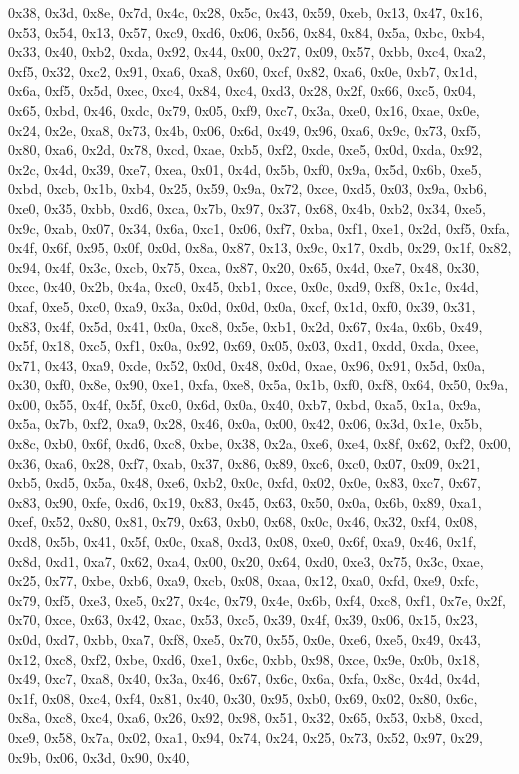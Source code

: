 \documentclass[
]{book}
\begin{document}
0x38, 0x3d, 0x8e, 0x7d, 0x4c, 0x28, 0x5c, 0x43, 0x59, 0xeb, 0x13, 0x47, 0x16, 0x53, 0x54, 0x13, 0x57, 0xc9, 0xd6, 0x06, 0x56, 0x84, 0x84, 0x5a, 0xbc, 0xb4, 0x33, 0x40, 0xb2, 0xda, 0x92, 0x44, 0x00, 0x27, 0x09, 0x57, 0xbb, 0xc4, 0xa2, 0xf5, 0x32, 0xc2, 0x91, 0xa6, 0xa8, 0x60, 0xcf, 0x82, 0xa6, 0x0e, 0xb7, 0x1d, 0x6a, 0xf5, 0x5d, 0xec, 0xc4, 0x84, 0xc4, 0xd3, 0x28, 0x2f, 0x66, 0xc5, 0x04, 0x65, 0xbd, 0x46, 0xdc, 0x79, 0x05, 0xf9, 0xc7, 0x3a, 0xe0, 0x16, 0xae, 0x0e, 0x24, 0x2e, 0xa8, 0x73, 0x4b, 0x06,
0x6d, 0x49, 0x96, 0xa6, 0x9c, 0x73, 0xf5, 0x80, 0xa6, 0x2d, 0x78, 0xcd, 0xae, 0xb5, 0xf2, 0xde, 0xe5, 0x0d, 0xda, 0x92, 0x2c, 0x4d, 0x39, 0xe7, 0xea, 0x01, 0x4d, 0x5b, 0xf0, 0x9a, 0x5d, 0x6b, 0xe5, 0xbd, 0xcb, 0x1b, 0xb4, 0x25, 0x59, 0x9a, 0x72, 0xce, 0xd5, 0x03, 0x9a, 0xb6, 0xe0, 0x35, 0xbb, 0xd6, 0xca, 0x7b, 0x97, 0x37, 0x68, 0x4b, 0xb2, 0x34, 0xe5, 0x9c, 0xab, 0x07, 0x34, 0x6a, 0xc1, 0x06, 0xf7, 0xba, 0xf1, 0xe1, 0x2d, 0xf5, 0xfa, 0x4f, 0x6f, 0x95, 0x0f, 0x0d, 0x8a, 0x87, 0x13, 0x9c, 0x17, 0xdb,
0x29, 0x1f, 0x82, 0x94, 0x4f, 0x3c, 0xcb, 0x75, 0xca, 0x87, 0x20, 0x65, 0x4d, 0xe7, 0x48, 0x30, 0xcc, 0x40, 0x2b, 0x4a, 0xc0, 0x45, 0xb1, 0xce, 0x0c, 0xd9, 0xf8, 0x1c, 0x4d, 0xaf, 0xe5, 0xc0, 0xa9, 0x3a, 0x0d, 0x0d, 0x0a, 0xcf, 0x1d, 0xf0, 0x39, 0x31, 0x83, 0x4f, 0x5d, 0x41, 0x0a, 0xc8, 0x5e, 0xb1, 0x2d, 0x67, 0x4a, 0x6b, 0x49, 0x5f, 0x18, 0xc5, 0xf1, 0x0a, 0x92, 0x69, 0x05, 0x03, 0xd1, 0xdd, 0xda, 0xee, 0x71, 0x43, 0xa9, 0xde, 0x52, 0x0d, 0x48, 0x0d, 0xae, 0x96, 0x91, 0x5d, 0x0a, 0x30, 0xf0, 0x8e,
0x90, 0xe1, 0xfa, 0xe8, 0x5a, 0x1b, 0xf0, 0xf8, 0x64, 0x50, 0x9a, 0x00, 0x55, 0x4f, 0x5f, 0xc0, 0x6d, 0x0a, 0x40, 0xb7, 0xbd, 0xa5, 0x1a, 0x9a, 0x5a, 0x7b, 0xf2, 0xa9, 0x28, 0x46, 0x0a, 0x00, 0x42, 0x06, 0x3d, 0x1e, 0x5b, 0x8c, 0xb0, 0x6f, 0xd6, 0xc8, 0xbe, 0x38, 0x2a, 0xe6, 0xe4, 0x8f, 0x62, 0xf2, 0x00, 0x36, 0xa6, 0x28, 0xf7, 0xab, 0x37, 0x86, 0x89, 0xc6, 0xc0, 0x07, 0x09, 0x21, 0xb5, 0xd5, 0x5a, 0x48, 0xe6, 0xb2, 0x0c, 0xfd, 0x02, 0x0e, 0x83, 0xc7, 0x67, 0x83, 0x90, 0xfe, 0xd6, 0x19, 0x83, 0x45,
0x63, 0x50, 0x0a, 0x6b, 0x89, 0xa1, 0xef, 0x52, 0x80, 0x81, 0x79, 0x63, 0xb0, 0x68, 0x0c, 0x46, 0x32, 0xf4, 0x08, 0xd8, 0x5b, 0x41, 0x5f, 0x0c, 0xa8, 0xd3, 0x08, 0xe0, 0x6f, 0xa9, 0x46, 0x1f, 0x8d, 0xd1, 0xa7, 0x62, 0xa4, 0x00, 0x20, 0x64, 0xd0, 0xe3, 0x75, 0x3c, 0xae, 0x25, 0x77, 0xbe, 0xb6, 0xa9, 0xcb, 0x08, 0xaa, 0x12, 0xa0, 0xfd, 0xe9, 0xfc, 0x79, 0xf5, 0xe3, 0xe5, 0x27, 0x4c, 0x79, 0x4e, 0x6b, 0xf4, 0xc8, 0xf1, 0x7e, 0x2f, 0x70, 0xce, 0x63, 0x42, 0xac, 0x53, 0xc5, 0x39, 0x4f, 0x39, 0x06, 0x15,
0x23, 0x0d, 0xd7, 0xbb, 0xa7, 0xf8, 0xe5, 0x70, 0x55, 0x0e, 0xe6, 0xe5, 0x49, 0x43, 0x12, 0xc8, 0xf2, 0xbe, 0xd6, 0xe1, 0x6c, 0xbb, 0x98, 0xce, 0x9e, 0x0b, 0x18, 0x49, 0xc7, 0xa8, 0x40, 0x3a, 0x46, 0x67, 0x6c, 0x6a, 0xfa, 0x8c, 0x4d, 0x4d, 0x1f, 0x08, 0xc4, 0xf4, 0x81, 0x40, 0x30, 0x95, 0xb0, 0x69, 0x02, 0x80, 0x6c, 0x8a, 0xc8, 0xc4, 0xa6, 0x26, 0x92, 0x98, 0x51, 0x32, 0x65, 0x53, 0xb8, 0xcd, 0xe9, 0x58, 0x7a, 0x02, 0xa1, 0x94, 0x74, 0x24, 0x25, 0x73, 0x52, 0x97, 0x29, 0x9b, 0x06, 0x3d, 0x90, 0x40,
\end{document}
